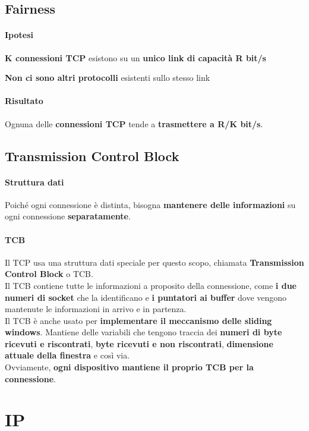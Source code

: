 \documentclass[10pt]{article}
\begin{document}
\subsection{Fairness}
\paragraph{Ipotesi} \begin{list}{}{}
\item \textbf{K connessioni TCP} esistono su un \textbf{unico link di capacità R bit/s}
\item \textbf{Non ci sono altri protocolli} esistenti sullo stesso link
\end{list}
\paragraph{Risultato} Ognuna delle \textbf{connessioni TCP} tende a \textbf{trasmettere a R/K bit/s}.
\subsection{Transmission Control Block}
\paragraph{Struttura dati} Poiché ogni connessione è distinta, bisogna \textbf{mantenere delle informazioni} su ogni connessione \textbf{separatamente}.
\paragraph{TCB} Il TCP usa una struttura dati speciale per questo scopo, chiamata \textbf{Transmission Control Block} o TCB.\\
Il TCB contiene tutte le informazioni a proposito della connessione, come \textbf{i due numeri di socket} che la identificano e \textbf{i puntatori ai buffer} dove vengono mantenute le informazioni in arrivo e in partenza.\\
Il TCB è anche usato per \textbf{implementare il meccanismo delle sliding windows}. Mantiene delle variabili che tengono traccia dei \textbf{numeri di byte ricevuti e riscontrati}, \textbf{byte ricevuti e non riscontrati}, \textbf{dimensione attuale della finestra} e così via.\\
Ovviamente, \textbf{ogni dispositivo mantiene il proprio TCB per la connessione}.
\pagebreak
\section{IP}
\pagebreak
\end{document}
